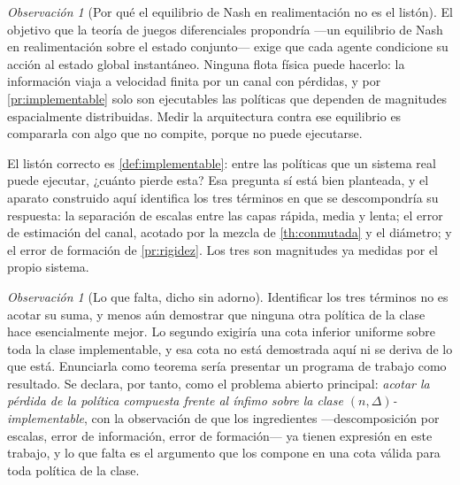 \documentclass[11pt,a4paper]{article}
\theoremstyle{plain}
\theoremstyle{definition}
\theoremstyle{remark}
\newtheorem{observacion}[teorema]{Observación}
\begin{document}
\begin{observacion}[Por qué el equilibrio de Nash en realimentación no es el
listón]
\label{obs:nash-no-listón}
El objetivo que la teoría de juegos diferenciales propondría —un equilibrio de
Nash en realimentación sobre el estado conjunto— exige que cada agente
condicione su acción al estado global instantáneo. Ninguna flota física puede
hacerlo: la información viaja a velocidad finita por un canal con pérdidas, y
por \cref{pr:implementable} solo son ejecutables las políticas que dependen de
magnitudes espacialmente distribuidas. Medir la arquitectura contra ese
equilibrio es compararla con algo que no compite, porque no puede ejecutarse.

El listón correcto es \cref{def:implementable}: entre las políticas que un
sistema real puede ejecutar, ¿cuánto pierde esta? Esa pregunta sí está bien
planteada, y el aparato construido aquí identifica los tres términos en que se
descompondría su respuesta: la separación de escalas entre las capas rápida,
media y lenta; el error de estimación del canal, acotado por la mezcla de
\cref{th:conmutada} y el diámetro; y el error de formación de
\cref{pr:rigidez}. Los tres son magnitudes ya medidas por el propio sistema.
\end{observacion}

\begin{observacion}[Lo que falta, dicho sin adorno]
\label{obs:falta-optimalidad}
Identificar los tres términos no es acotar su suma, y menos aún demostrar que
ninguna otra política de la clase hace esencialmente mejor. Lo segundo exigiría
una cota inferior uniforme sobre toda la clase implementable, y esa cota no está
demostrada aquí ni se deriva de lo que está. Enunciarla como teorema sería
presentar un programa de trabajo como resultado. Se declara, por tanto, como el
problema abierto principal: \emph{acotar la pérdida de la política compuesta
frente al ínfimo sobre la clase $(n,\Delta)$-implementable}, con la observación
de que los ingredientes —descomposición por escalas, error de información,
error de formación— ya tienen expresión en este trabajo, y lo que falta es el
argumento que los compone en una cota válida para toda política de la clase.
\end{observacion}
\end{document}

